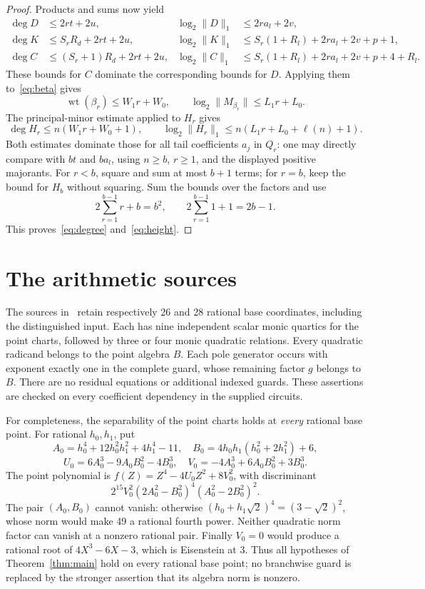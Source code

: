 \documentclass[11pt,a4paper]{article}
\begin{document}
\begin{proof}
Products and sums now yield
\begin{align*}
 \deg D&\le2rt+2u,&\log_2\|D\|_1&\le2ra_l+2v,\\
 \deg K&\le S_rR_d+2rt+2u,&
 \log_2\|K\|_1&\le S_r(1+R_l)+2ra_l+2v+p+1,\\
 \deg C&\le(S_r+1)R_d+2rt+2u,&
 \log_2\|C\|_1&\le S_r(1+R_l)+2ra_l+2v+p+4+R_l.
\end{align*}
These bounds for $C$ dominate the corresponding bounds for $D$.
Applying them to~\eqref{eq:beta} gives
\[
 \operatorname{wt}(\beta_r)\le W_1r+W_0,\qquad
 \log_2\|M_{\beta_r}\|\le L_1r+L_0.
\]
The principal-minor estimate applied to $H_r$ gives
\[
 \deg H_r\le n(W_1r+W_0+1),\qquad
 \log_2\|H_r\|_1\le n(L_1r+L_0+\ell(n)+1).
\]
Both estimates dominate those for all tail coefficients $a_j$
in $Q_r$: one may directly compare with $bt$ and $ba_l$,
using $n\ge b$, $r\ge1$, and the displayed positive majorants.
For $r<b$, square and sum at most $b+1$ terms; for $r=b$,
keep the bound for $H_b$ without squaring. Sum the bounds over
the factors and use
\[
 2\sum_{r=1}^{b-1}r+b=b^2,\qquad
 2\sum_{r=1}^{b-1}1+1=2b-1.
\]
This proves~\eqref{eq:degree} and~\eqref{eq:height}.
\end{proof}

\section{The arithmetic sources}

The sources in~\cite{Source27,Source29} retain respectively
26 and 28 rational base coordinates, including the distinguished
input. Each has nine independent scalar monic quartics for the
point charts, followed by three or four monic quadratic relations.
Every quadratic radicand belongs to the point algebra $B$.
Each pole generator occurs with exponent exactly one in the complete
guard, whose remaining factor $g$ belongs to $B$. There are no
residual equations or additional indexed guards. These assertions
are checked on every coefficient dependency in the supplied circuits.

For completeness, the separability of the point charts holds at
\emph{every} rational base point. For rational $h_0,h_1$, put
\[
 A_0=h_0^4+12h_0^2h_1^2+4h_1^4-11,\quad
 B_0=4h_0h_1(h_0^2+2h_1^2)+6,
\]
\[
 U_0=6A_0^3-9A_0B_0^2-4B_0^3,\quad
 V_0=-4A_0^3+6A_0B_0^2+3B_0^3.
\]
The point polynomial is
$f(Z)=Z^4-4U_0Z^2+8V_0^2$, with discriminant
\[
 2^{15}V_0^2(2A_0^2-B_0^2)^4(A_0^2-2B_0^2)^2.
\]
The pair $(A_0,B_0)$ cannot vanish: otherwise
$(h_0+h_1\sqrt2)^4=(3-\sqrt2)^2$, whose norm would make
49 a rational fourth power. Neither quadratic norm factor
can vanish at a nonzero rational pair. Finally $V_0=0$ would
produce a rational root of $4X^3-6X-3$, which is Eisenstein
at 3. Thus all hypotheses of Theorem~\ref{thm:main} hold on
every rational base point; no branchwise guard is replaced by
the stronger assertion that its algebra norm is nonzero.
\end{document}
